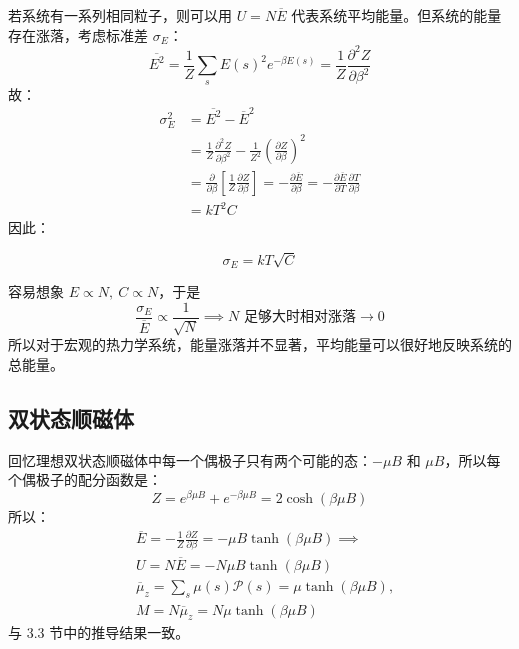 若系统有一系列相同粒子，则可以用 $U=N\overline E$ 代表系统平均能量。但系统的能量存在涨落，考虑标准差 $\sigma_E $：
\begin{equation}
    \overline{E^2}=\frac{1}{Z}\sum_s E(s)^2e^{-\beta E(s)}=\frac{1}{Z}\frac{\partial^2 Z}{\partial \beta^2}
\end{equation}
故：
\begin{equation}  
    \begin{split}
        \sigma_E^2 &=\overline{E^2}-\overline E^2\\
        &=\frac{1}{Z}\frac{\partial^2 Z}{\partial \beta^2}-\frac{1}{Z^2}\left(\frac{\partial Z}{\partial \beta}\right)^2\\
        &=\frac{\partial}{\partial \beta}\left[\frac{1}{Z}\frac{\partial Z}{\partial \beta}\right]
        =-\frac{\partial \overline E}{\partial \beta}
        = -\frac{\partial \overline E}{\partial T}\frac{\partial T}{\partial \beta}\\
        &= kT^2 C        
    \end{split}
\end{equation}
因此：
\begin{corollary}[正则系综的能量涨落]
    \begin{equation}
        \sigma_E=kT\sqrt{C}
    \end{equation}
\end{corollary}

容易想象 $E\propto N,\ C\propto N$，于是
\begin{equation}
    \frac{\sigma_E}{\overline E}\propto \frac{1}{\sqrt{N}}
    \implies
    N\text{ 足够大时相对涨落}\to 0
\end{equation}
所以对于宏观的热力学系统，能量涨落并不显著，平均能量可以很好地反映系统的总能量。

\subsection{双状态顺磁体}
回忆理想双状态顺磁体中每一个偶极子只有两个可能的态：$-\mu B$ 和 $\mu B$，所以每个偶极子的配分函数是：
\begin{equation}
    Z=e^{\beta\mu B}+e^{-\beta\mu B}=2\cosh(\beta\mu B)
\end{equation}
所以：
\begin{align}
    &\overline E=-\frac{1}{Z}\frac{\partial Z}{\partial \beta}
    =-\mu B\tanh(\beta\mu B) \implies\\
    &U= N \overline E = -N\mu B\tanh(\beta\mu B)\\
    &\overline\mu_z=\sum_s \mu(s)\mathcal{P}(s)=\mu\tanh(\beta\mu B),\\
    &M=N\overline\mu_z=N\mu\tanh(\beta\mu B)
\end{align}
与 3.3 节中的推导结果一致。

